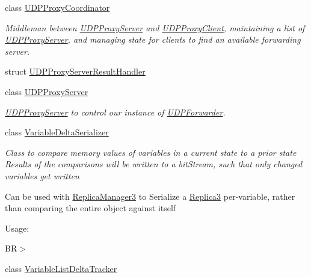 \begin{DoxyCompactItemize}
class \hyperlink{class_rak_net_1_1_u_d_p_proxy_coordinator}{U\-D\-P\-Proxy\-Coordinator}
\begin{DoxyCompactList}\small\item\em Middleman between \hyperlink{class_rak_net_1_1_u_d_p_proxy_server}{U\-D\-P\-Proxy\-Server} and \hyperlink{class_rak_net_1_1_u_d_p_proxy_client}{U\-D\-P\-Proxy\-Client}, maintaining a list of \hyperlink{class_rak_net_1_1_u_d_p_proxy_server}{U\-D\-P\-Proxy\-Server}, and managing state for clients to find an available forwarding server. \end{DoxyCompactList}\item 
struct \hyperlink{struct_rak_net_1_1_u_d_p_proxy_server_result_handler}{U\-D\-P\-Proxy\-Server\-Result\-Handler}
\item 
class \hyperlink{class_rak_net_1_1_u_d_p_proxy_server}{U\-D\-P\-Proxy\-Server}
\begin{DoxyCompactList}\small\item\em \hyperlink{class_rak_net_1_1_u_d_p_proxy_server}{U\-D\-P\-Proxy\-Server} to control our instance of \hyperlink{class_rak_net_1_1_u_d_p_forwarder}{U\-D\-P\-Forwarder}. \end{DoxyCompactList}\item 
class \hyperlink{class_rak_net_1_1_variable_delta_serializer}{Variable\-Delta\-Serializer}
\begin{DoxyCompactList}\small\item\em Class to compare memory values of variables in a current state to a prior state Results of the comparisons will be written to a bit\-Stream, such that only changed variables get written\par
 Can be used with \hyperlink{class_rak_net_1_1_replica_manager3}{Replica\-Manager3} to Serialize a \hyperlink{class_rak_net_1_1_replica3}{Replica3} per-\/variable, rather than comparing the entire object against itself\par
 Usage\-:\par
 B\-R$>$ \end{DoxyCompactList}\item 
class \hyperlink{class_rak_net_1_1_variable_list_delta_tracker}{Variable\-List\-Delta\-Tracker}
\end{DoxyCompactItemize}
